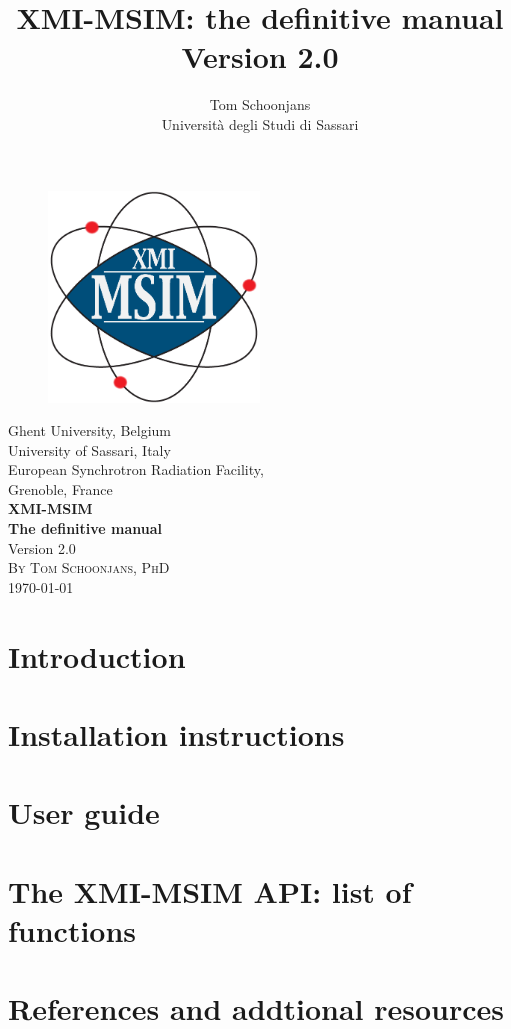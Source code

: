 \documentclass[11pt,a4paper,oneside,titlepage]{article}
\title{XMI-MSIM: the definitive manual\\\small{Version 2.0}}
\author{Tom Schoonjans\\Universit\`a degli Studi di Sassari}
\begin{document}
\begin{titlepage}
\begin{center}
\begin{figure}
\begin{center}
\includegraphics[width=0.5\textwidth]{Logo_xmi_msim.png}
\end{center}
\end{figure}
\vspace{1cm}
\Large{Ghent University, Belgium\\}
\vspace{0.7cm}
\Large{University of Sassari, Italy\\}
\vspace{0.7cm}
\Large{European Synchrotron Radiation Facility,\\Grenoble, France\\}
\vspace{1.5cm}
\Huge{\bfseries{XMI-MSIM\\}}
\vspace{1.5cm}
\huge{\bfseries{The definitive manual\\}}
\vspace{1.5cm}
\Large{Version 2.0\\}
\vspace{1.5cm}
\textsc{\large{By Tom Schoonjans, PhD\\}}
\vfill
{\large \today}
\end{center}
\end{titlepage}


\tableofcontents
\newpage

\section{Introduction}


\section{Installation instructions}

\section{User guide}

\section{The XMI-MSIM API: list of functions}

\section{References and addtional resources}

\end{document}
